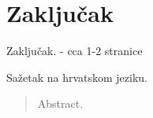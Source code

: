 \documentclass[times, utf8, zavrsni]{fer}
\begin{document}
\chapter{Zaključak}
Zaključak.
- cca 1-2 stranice

{}


\begin{sazetak}
Sažetak na hrvatskom jeziku.

\end{sazetak}

\begin{abstract}
Abstract.

\end{abstract}
\end{document}
